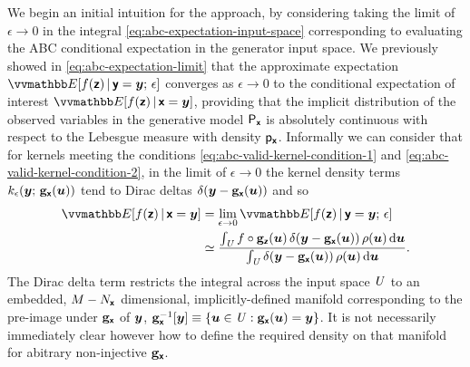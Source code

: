 We begin an initial intuition for the approach, by considering taking the limit of $\epsilon \to 0$ in the integral \eqref{eq:abc-expectation-input-space} corresponding to evaluating the \ac{ABC} conditional expectation in the generator input space. We previously showed in \eqref{eq:abc-expectation-limit} that the approximate expectation $\expc{f(\rvct{z}) \gvn \rvct{y}= \vct{y};\,\epsilon}$ converges as $\epsilon \to 0$ to the conditional expectation of interest $\expc{f(\rvct{z}) \gvn \rvct{x} = \vct{y}}$, providing that the implicit distribution of the observed variables in the generative model $\mathsf{P}_{\boldsymbol{\mathsf{x}}}$ is absolutely continuous with respect to the Lebesgue measure with density $\mathsf{p}_{\boldsymbol{\mathsf{x}}}$. Informally we can consider that for kernels meeting the conditions \eqref{eq:abc-valid-kernel-condition-1} and \eqref{eq:abc-valid-kernel-condition-2}, in the limit of $\epsilon \to 0$ the kernel density terms $k_\epsilon\lpa{\vct{y}};\,\genfunc_{\rvct{x}}(\vct{u})\rpa$ tend to Dirac deltas ${\delta}\lpa\vct{y} - \genfunc_{\rvct{x}}(\vct{u})\rpa$ and so
\begin{align}\label{eq:expectation-input-space-limit}
  \expc{f(\rvct{z}) \gvn \rvct{x}=\vct{y}} &=
  \lim_{\epsilon\to 0}  \expc{f(\rvct{z}) \gvn \rvct{y}=\vct{y};\,\epsilon} 
  \\
  &\simeq
  \frac{
  \int_{\set{U}} 
    f\circ\genfunc_{\rvct{z}}(\vct{u}) \,
    \delta\lpa\vct{y} - \genfunc_{\rvct{x}}(\vct{u})\rpa\,
    \rho(\vct{u})
  \,\dr\vct{u}
  }
  {
    \int_{\set{U}} 
    \delta\lpa\vct{y} - \genfunc_{\rvct{x}}(\vct{u})\rpa\,
    \rho(\vct{u})
  \,\dr\vct{u}
  }.
\end{align}
The Dirac delta term restricts the integral across the input space $\mathit{U}$ to an embedded, $M - N_{\boldsymbol{\mathsf{x}}}$ dimensional, implicitly-defined manifold corresponding to the pre-image under ${\mathbf{g}}_{\boldsymbol{\mathsf{x}}}$ of $\boldsymbol{y}$, $\preimage{\genfunc_{\rvct{x}}}{\vct{y}} \equiv \fset{\vct{u} \in \set{U} :  \genfunc_{\rvct{x}}(\vct{u}) = \vct{y}}$. It is not necessarily immediately clear however how to define the required density on that manifold for abitrary non-injective ${\mathbf{g}}_{\boldsymbol{\mathsf{x}}}$.

